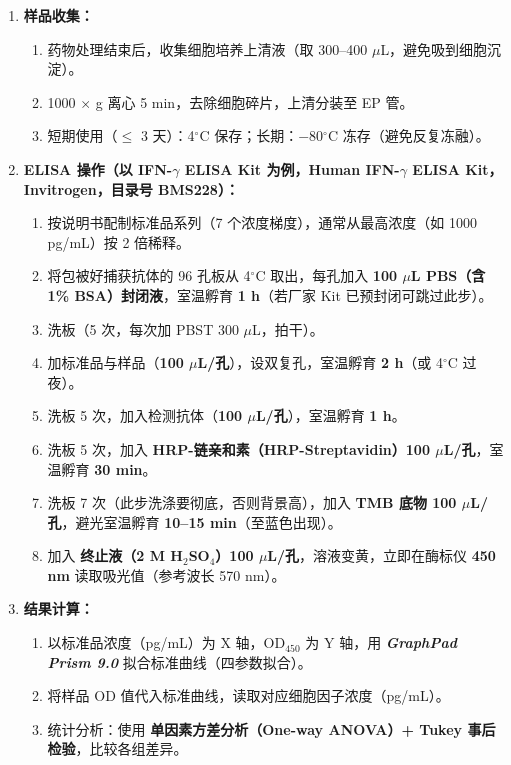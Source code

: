 \documentclass[12pt,a4paper,twoside]{article}
\newcommand{\software}[1]{\textbf{\textit{#1}}}
\begin{document}
\begin{enumerate}
  \item \textbf{样品收集：}
    \begin{enumerate}
      \item 药物处理结束后，收集细胞培养上清液（取 300--400 $\mu$L，避免吸到细胞沉淀）。
      \item 1000 $\times$ g 离心 5 min，去除细胞碎片，上清分装至 EP 管。
      \item 短期使用（$\leq$ 3 天）：4$^{\circ}$C 保存；长期：$-$80$^{\circ}$C 冻存（避免反复冻融）。
    \end{enumerate}

  \item \textbf{ELISA 操作（以 IFN-$\gamma$ ELISA Kit 为例，Human IFN-$\gamma$ ELISA Kit，Invitrogen，目录号 BMS228）：}
    \begin{enumerate}
      \item 按说明书配制标准品系列（7 个浓度梯度），通常从最高浓度（如 1000 pg/mL）按 2 倍稀释。
      \item 将包被好捕获抗体的 96 孔板从 4$^{\circ}$C 取出，每孔加入 \textbf{100 $\mu$L PBS（含 1\% BSA）封闭液}，室温孵育 \textbf{1 h}（若厂家 Kit 已预封闭可跳过此步）。
      \item 洗板（5 次，每次加 PBST 300 $\mu$L，拍干）。
      \item 加标准品与样品（\textbf{100 $\mu$L/孔}），设双复孔，室温孵育 \textbf{2 h}（或 4$^{\circ}$C 过夜）。
      \item 洗板 5 次，加入检测抗体（\textbf{100 $\mu$L/孔}），室温孵育 \textbf{1 h}。
      \item 洗板 5 次，加入 \textbf{HRP-链亲和素（HRP-Streptavidin）100 $\mu$L/孔}，室温孵育 \textbf{30 min}。
      \item 洗板 7 次（此步洗涤要彻底，否则背景高），加入 \textbf{TMB 底物 100 $\mu$L/孔}，避光室温孵育 \textbf{10--15 min}（至蓝色出现）。
      \item 加入 \textbf{终止液（2 M H$_2$SO$_4$）100 $\mu$L/孔}，溶液变黄，立即在酶标仪 \textbf{450 nm} 读取吸光值（参考波长 570 nm）。
    \end{enumerate}

  \item \textbf{结果计算：}
    \begin{enumerate}
      \item 以标准品浓度（pg/mL）为 X 轴，OD$_{450}$ 为 Y 轴，用 \software{GraphPad Prism 9.0} 拟合标准曲线（四参数拟合）。
      \item 将样品 OD 值代入标准曲线，读取对应细胞因子浓度（pg/mL）。
      \item 统计分析：使用 \textbf{单因素方差分析（One-way ANOVA）+ Tukey 事后检验}，比较各组差异。
    \end{enumerate}
\end{enumerate}
\end{document}
